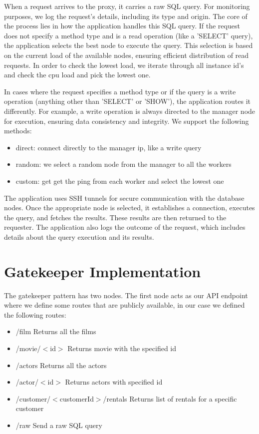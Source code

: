 \documentclass[11pt]{article}
\begin{document}
When a request arrives to the proxy, it carries a raw SQL query. For monitoring purposes, we log the request's details, including its type and origin. The core of the process lies in how the application handles this SQL query. If the request does not specify a method type and is a read operation (like a 'SELECT' query), the application selects the best node to execute the query. This selection is based on the current load of the available nodes, ensuring efficient distribution of read requests. In order to check the lowest load, we iterate through all instance id's and check the cpu load and pick the lowest one.
\newline

In cases where the request specifies a method type or if the query is a write operation (anything other than 'SELECT' or 'SHOW'), the application routes it differently. For example, a write operation is always directed to the manager node for execution, ensuring data consistency and integrity. We support the following methods: 
\begin{itemize}
	\item direct: connect directly to the manager ip, like a write query
	\item random: we select a random node from the manager to all the workers
	\item custom: get get the ping from each worker and select the lowest one
\end{itemize}
\newline

The application uses SSH tunnels for secure communication with the database nodes. Once the appropriate node is selected, it establishes a connection, executes the query, and fetches the results. These results are then returned to the requester. The application also logs the outcome of the request, which includes details about the query execution and its results.

\section{Gatekeeper Implementation}
The gatekeeper pattern has two nodes. The first node acts as our API endpoint where we define some routes that are publicly available, in our case we defined the following routes:
\begin{itemize}
	\item /film Returns all the films
	\item /movie/$<$id$>$ Returns movie with the specified id
	\item /actors Returns all the actors
	\item /actor/$<$id$>$ Returns actors with specified id
	\item /customer/$<$customerId$>$/rentals Returns list of rentals for a specific customer
	\item /raw Send a raw SQL query
\end{itemize}
\end{document}
